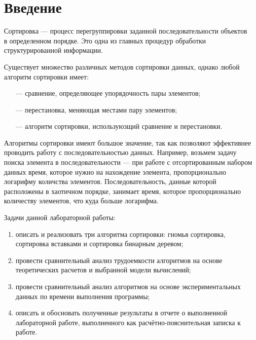 \chapter*{Введение}

Сортировка --- процесс перегруппировки заданной последовательности объектов в определенном порядке. Это одна из главных процедур обработки структурированной информации.

Существует множество различных методов сортировки данных, однако любой алгоритм сортировки имеет:

\begin{itemize}
	\item[---] сравнение, определяющее упорядочность пары элементов;
	\item[---] перестановка, меняющая местами пару элементов;
	\item[---] алгоритм сортировки, используюзщий сравнение и перестановки.
\end{itemize}

Алгоритмы сортировки имеют большое значение, так как позволяют эффективнее проводить работу с последовательностью данных. Например, возьмем задачу поиска элемента в последовательности --- при работе с отсортированным набором данных время, которое нужно на нахождение элемента, пропорционально логарифму количства элементов. Последовательность, данные которой расположены в хаотичном порядке, занимает время, которое пропорционально количеству элементов, что куда больше логарифма.

\bigskip

Задачи данной лабораторной работы:

\begin{enumerate}[label=\arabic*)]
	\item описать и реализовать три алгоритма сортировки:  гномья сортировка, сортировка вставками и сортировка бинарным деревом;
	\item провести сравнительный анализ трудоемкости алгоритмов на основе теоретических расчетов и выбранной модели вычислений;
	\item провести сравнительный анализ алгоритмов на основе экспериментальных данных по времени выполнения программы;
	\item описать и обосновать полученные результаты в отчете о выполненной лабораторной работе, выполненного как расчётно-пояснительная записка к работе.
\end{enumerate}

